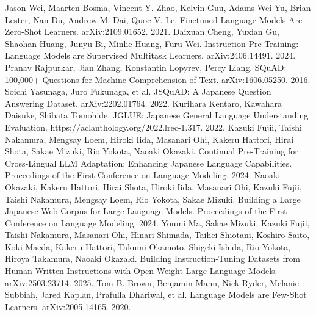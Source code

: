 \documentclass[a4paper,11pt]{jreport}
\begin{document}
\begin{thebibliography}{99}
  Jason Wei, Maarten Bosma, Vincent Y. Zhao, Kelvin Guu, Adams Wei Yu, Brian Lester, Nan Du, Andrew M. Dai, Quoc V. Le. Finetuned Language Models Are Zero-Shot Learners. arXiv:2109.01652. 2021.
  Daixuan Cheng, Yuxian Gu, Shaohan Huang, Junyu Bi, Minlie Huang, Furu Wei. Instruction Pre-Training: Language Models are Supervised Multitask Learners. arXiv:2406.14491. 2024.
  Pranav Rajpurkar, Jian Zhang, Konstantin Lopyrev, Percy Liang. SQuAD: 100,000+ Questions for Machine Comprehension of Text. arXiv:1606.05250. 2016.
  Soichi Yasunaga, Juro Fukunaga, et al. JSQuAD: A Japanese Question Answering Dataset. arXiv:2202.01764. 2022.
  Kurihara Kentaro, Kawahara Daisuke, Shibata Tomohide. JGLUE: Japanese General Language Understanding Evaluation. https://aclanthology.org/2022.lrec-1.317. 2022.
  Kazuki Fujii, Taishi Nakamura, Mengsay Loem, Hiroki Iida, Masanari Ohi, Kakeru Hattori, Hirai Shota, Sakae Mizuki, Rio Yokota, Naoaki Okazaki. Continual Pre-Training for Cross-Lingual LLM Adaptation: Enhancing Japanese Language Capabilities. Proceedings of the First Conference on Language Modeling. 2024.
  Naoaki Okazaki, Kakeru Hattori, Hirai Shota, Hiroki Iida, Masanari Ohi, Kazuki Fujii, Taishi Nakamura, Mengsay Loem, Rio Yokota, Sakae Mizuki. Building a Large Japanese Web Corpus for Large Language Models. Proceedings of the First Conference on Language Modeling. 2024.
  Youmi Ma, Sakae Mizuki, Kazuki Fujii, Taishi Nakamura, Masanari Ohi, Hinari Shimada, Taihei Shiotani, Koshiro Saito, Koki Maeda, Kakeru Hattori, Takumi Okamoto, Shigeki Ishida, Rio Yokota, Hiroya Takamura, Naoaki Okazaki. Building Instruction-Tuning Datasets from Human-Written Instructions with Open-Weight Large Language Models. arXiv:2503.23714. 2025.
  Tom B. Brown, Benjamin Mann, Nick Ryder, Melanie Subbiah, Jared Kaplan, Prafulla Dhariwal, et al. Language Models are Few-Shot Learners. arXiv:2005.14165. 2020.
\end{thebibliography}
\end{document}
